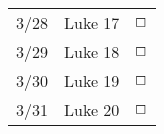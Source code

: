 \documentclass[10pt,landscape,letterpaper]{article}
\begin{document}
\begin{multicols}{5}
\begin{tabular}{p{0.5in}p{0.65in}p{0.3in}}
3/28 & Luke 17 & $\boxempty$ \\
3/29 & Luke 18 & $\boxempty$ \\
3/30 & Luke 19 & $\boxempty$ \\
3/31 & Luke 20 & $\boxempty$ \\

\end{tabular}



\end{multicols}
\end{document}

